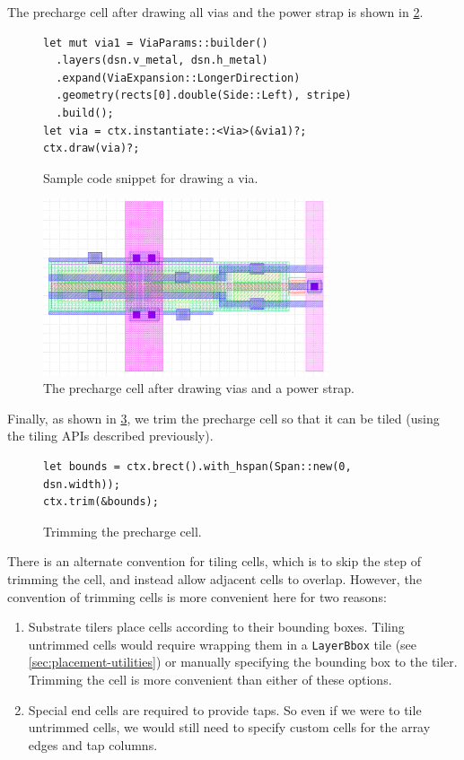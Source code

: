 The precharge cell after drawing all vias and the power strap is shown in \ref{fig:precharge-vias}.

\begin{figure}[H] \centering
\begin{verbatim}
let mut via1 = ViaParams::builder()
  .layers(dsn.v_metal, dsn.h_metal)
  .expand(ViaExpansion::LongerDirection)
  .geometry(rects[0].double(Side::Left), stripe)
  .build();
let via = ctx.instantiate::<Via>(&via1)?;
ctx.draw(via)?;
\end{verbatim}
\caption{
Sample code snippet for drawing a via.
\label{fig:sample-via-code}
}
\end{figure}

\begin{figure}[H] \centering
\includegraphics[width=0.75\textwidth]{figures/precharge_vias.png}
\caption{The precharge cell after drawing vias and a power strap. \label{fig:precharge-vias}}
\end{figure}


Finally, as shown in \ref{fig:precharge-trimmed}, we trim the precharge cell so that it can be tiled (using the tiling APIs described previously).

\begin{figure}[H] \centering
\begin{verbatim}
let bounds = ctx.brect().with_hspan(Span::new(0, dsn.width));
ctx.trim(&bounds);
\end{verbatim}
\caption{Trimming the precharge cell. \label{fig:precharge-trimmed}}
\end{figure}

There is an alternate convention for tiling cells, which is to skip the step of trimming the cell, and instead
allow adjacent cells to overlap. However, the convention of trimming cells is more convenient here for two reasons:
\begin{enumerate}
\item Substrate tilers place cells according to their bounding boxes. Tiling untrimmed cells would require wrapping them
  in a \verb|LayerBbox| tile (see \ref{sec:placement-utilities}) or manually specifying the bounding box to the tiler. Trimming the cell is more convenient than
  either of these options.
\item Special end cells are required to provide taps. So even if we were to tile untrimmed cells, we would still need to specify custom cells for
  the array edges and tap columns.
\end{enumerate}

